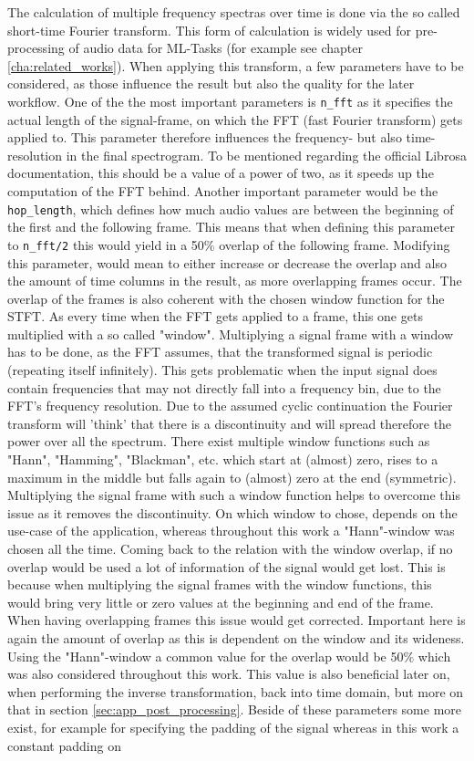 The calculation of multiple frequency spectras over time is done via the so called short-time Fourier transform. This form of calculation is widely used for pre-processing of audio data for ML-Tasks (for example see chapter \ref{cha:related_works}). When applying this transform, a few parameters have to be considered, as those influence the result but also the quality for the later workflow. One of the the most important parameters is \texttt{n\_fft} as it specifies the actual length of the signal-frame, on which the FFT (fast Fourier transform) gets applied to. This parameter therefore influences the frequency- but also time-resolution in the final spectrogram. To be mentioned regarding the official Librosa documentation, this should be a value of a power of two, as it speeds up the computation of the FFT behind. Another important parameter would be the \texttt{hop\_length}, which defines how much audio values are between the beginning of the first and the following frame. This means that when defining this parameter to \texttt{n\_fft/2} this would yield in a 50\% overlap of the following frame. Modifying this parameter, would mean to either increase or decrease the overlap and also the amount of time columns in the result, as more overlapping frames occur. The overlap of the frames is also coherent with the chosen window function for the STFT. As every time when the FFT gets applied to a frame, this one gets multiplied with a so called "window". Multiplying a signal frame with a window has to be done, as the FFT assumes, that the transformed signal is periodic (repeating itself infinitely). \cite{heinzel2002spectrum} This gets problematic when the input signal does contain frequencies that may not directly fall into a frequency bin, due to the FFT's frequency resolution. Due to the assumed cyclic continuation the Fourier transform will 'think' that there is a discontinuity and will spread therefore the power over all the spectrum. There exist multiple window functions such as "Hann", "Hamming", "Blackman", etc. which start at (almost) zero, rises to a maximum in the middle but falls again to (almost) zero at the end (symmetric). Multiplying the signal frame with such a window function helps to overcome this issue as it removes the discontinuity. On which window to chose, depends on the use-case of the application, whereas throughout this work a "Hann"-window was chosen all the time. Coming back to the relation with the window overlap, if no overlap would be used a lot of information of the signal would get lost. This is because when multiplying the signal frames with the window functions, this would bring very little or zero values at the beginning and end of the frame. \cite{heinzel2002spectrum} When having overlapping frames this issue would get corrected. Important here is again the amount of overlap as this is dependent on the window and its wideness. Using the "Hann"-window a common value for the overlap would be 50\% which was also considered throughout this work. This value is also beneficial later on, when performing the inverse transformation, back into time domain, but more on that in section \ref{sec:app_post_processing}. Beside of these parameters some more exist, for example for specifying the padding of the signal whereas in this work a constant padding on 